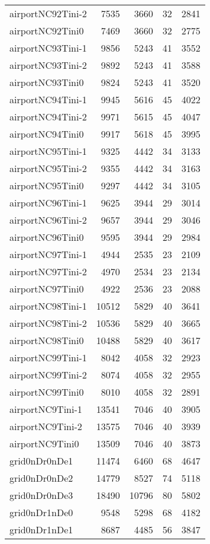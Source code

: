 \begin{longtable}{lrrrr}
airportNC92Tini-2 & 7535 & 3660 & 32 & 2841 \\
airportNC92Tini0 & 7469 & 3660 & 32 & 2775 \\
airportNC93Tini-1 & 9856 & 5243 & 41 & 3552 \\
airportNC93Tini-2 & 9892 & 5243 & 41 & 3588 \\
airportNC93Tini0 & 9824 & 5243 & 41 & 3520 \\
airportNC94Tini-1 & 9945 & 5616 & 45 & 4022 \\
airportNC94Tini-2 & 9971 & 5615 & 45 & 4047 \\
airportNC94Tini0 & 9917 & 5618 & 45 & 3995 \\
airportNC95Tini-1 & 9325 & 4442 & 34 & 3133 \\
airportNC95Tini-2 & 9355 & 4442 & 34 & 3163 \\
airportNC95Tini0 & 9297 & 4442 & 34 & 3105 \\
airportNC96Tini-1 & 9625 & 3944 & 29 & 3014 \\
airportNC96Tini-2 & 9657 & 3944 & 29 & 3046 \\
airportNC96Tini0 & 9595 & 3944 & 29 & 2984 \\
airportNC97Tini-1 & 4944 & 2535 & 23 & 2109 \\
airportNC97Tini-2 & 4970 & 2534 & 23 & 2134 \\
airportNC97Tini0 & 4922 & 2536 & 23 & 2088 \\
airportNC98Tini-1 & 10512 & 5829 & 40 & 3641 \\
airportNC98Tini-2 & 10536 & 5829 & 40 & 3665 \\
airportNC98Tini0 & 10488 & 5829 & 40 & 3617 \\
airportNC99Tini-1 & 8042 & 4058 & 32 & 2923 \\
airportNC99Tini-2 & 8074 & 4058 & 32 & 2955 \\
airportNC99Tini0 & 8010 & 4058 & 32 & 2891 \\
airportNC9Tini-1 & 13541 & 7046 & 40 & 3905 \\
airportNC9Tini-2 & 13575 & 7046 & 40 & 3939 \\
airportNC9Tini0 & 13509 & 7046 & 40 & 3873 \\
grid0nDr0nDe1 & 11474 & 6460 & 68 & 4647 \\
grid0nDr0nDe2 & 14779 & 8527 & 74 & 5118 \\
grid0nDr0nDe3 & 18490 & 10796 & 80 & 5802 \\
grid0nDr1nDe0 & 9548 & 5298 & 68 & 4182 \\
grid0nDr1nDe1 & 8687 & 4485 & 56 & 3847 \\

\end{longtable}
